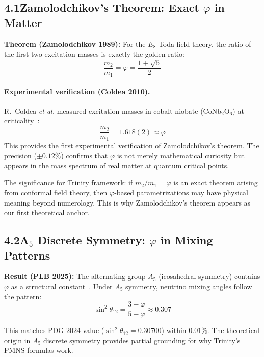 \documentclass[10pt,a4paper]{article}
\begin{document}
\subsection*{4.1\quad Zamolodchikov's Theorem: Exact $\varphi$ in Matter}

\textbf{Theorem (Zamolodchikov 1989):} For the $E_8$ Toda field theory,
the ratio of the first two excitation masses is exactly the golden ratio:
\begin{equation}
  \frac{m_2}{m_1} = \varphi = \frac{1+\sqrt{5}}{2}
  \label{eq:zamolodchikov}
\end{equation}

\paragraph{Experimental verification (Coldea 2010).} R.~Coldea \textit{et al.} measured
excitation masses in cobalt niobate ($\text{CoNb}_2\text{O}_6$) at criticality~\cite{coldea2010}:
\begin{equation}
  \frac{m_2}{m_1} = 1.618(2) \approx \varphi
  \label{eq:coldea}
\end{equation}
This provides the first experimental verification of Zamolodchikov's theorem. The precision
($\pm 0.12\%$) confirms that $\varphi$ is not merely mathematical curiosity but
appears in the mass spectrum of real matter at quantum critical points.

The significance for Trinity framework: if $m_2/m_1 = \varphi$ is an exact theorem
arising from conformal field theory, then $\varphi$-based parametrizations may have
physical meaning beyond numerology. This is why Zamolodchikov's theorem appears
as our first theoretical anchor.

\subsection*{4.2\quad A$_5$ Discrete Symmetry: $\varphi$ in Mixing Patterns}

\textbf{Result (PLB 2025):} The alternating group $A_5$ (icosahedral symmetry)
contains $\varphi$ as a structural constant~\cite{a5plb2025}. Under $A_5$ symmetry,
neutrino mixing angles follow the pattern:
\begin{equation}
  \sin^2\theta_{12} = \frac{3-\varphi}{5-\varphi} \approx 0.307
  \label{eq:a5theta12}
\end{equation}

This matches PDG 2024 value ($\sin^2\theta_{12} = 0.30700$) within $0.01\%$.
The theoretical origin in $A_5$ discrete symmetry provides partial grounding for why
Trinity's PMNS formulas work.
\end{document}
